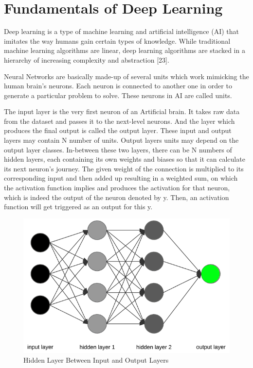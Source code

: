 \section{Fundamentals of Deep Learning}

Deep learning is a type of machine learning and artificial intelligence (AI) that imitates the way humans gain certain types of knowledge. While traditional machine learning algorithms are linear, deep learning algorithms are stacked in a hierarchy of increasing complexity and abstraction [23].

\vspace{5mm}
\noindent Neural Networks are basically made-up of several units which work mimicking the human brain's neurons. Each neuron is connected to another one in order to generate a particular problem to solve. These neurons in AI are called units.

\vspace{5mm}
\noindent The input layer is the very first neuron of an Artificial brain. It takes raw data from the dataset and passes it to the next-level neurons. And the layer which produces the final output is called the output layer. These input and output layers may contain N number of units. Output layers units may depend on the output layer classes. In-between these two layers, there can be N numbers of hidden layers, each containing its own weights and biases so that it can calculate its next neuron's journey. The given weight of the connection is multiplied to its corresponding input and then added up resulting in a weighted sum, on which the activation function implies and produces the activation for that neuron, which is indeed the output of the neuron denoted by y. Then, an activation function will get triggered as an output for this y.

\vspace{5mm}
\begin{figure}[hbt!]
\centering
\includegraphics[scale=0.3]{images/fig-4.png}
\caption{Hidden Layer Between Input and Output Layers}
\label{fig:x Hidden Layer Between Input and Output Layers}
\end{figure}

